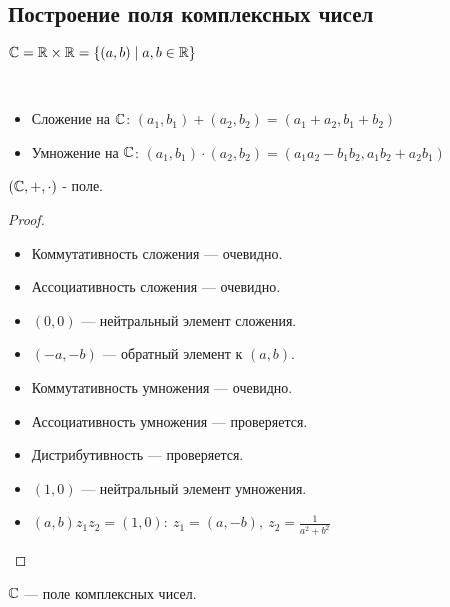 \begin{normalsize}

\section{Построение поля комплексных чисел}

\begin{defn}
    $\mathbb{C} = \mathbb{R} \times \mathbb{R} = \{(a, b) \mid a, b \in \mathbb{R}\}$\\
\end{defn}

\begin{defn} \
    \begin{itemize}
        \item Сложение на $\mathbb{C}$: $(a_1, b_1) + (a_2, b_2) = (a_1 + a_2, b_1 + b_2)$
        \item Умножение на $\mathbb{C}$: $(a_1, b_1) \cdot (a_2, b_2) = (a_1a_2 - b_1b_2, a_1b_2 + a_2b_1)$
    \end{itemize}
\end{defn}

\begin{theorem-non}
    $(\mathbb{C}, +, \cdot)$ - поле.
\end{theorem-non}

\begin{proof}
    \begin{itemize}
        \item Коммутативность сложения --- очевидно.
        \item Ассоциативность сложения --- очевидно.
        \item $(0, 0)$ --- нейтральный элемент сложения.
        \item $(-a, -b)$ --- обратный элемент к $(a, b)$.
        \item Коммутативность умножения --- очевидно.
        \item Ассоциативность умножения --- проверяется.
        \item Дистрибутивность --- проверяется.
        \item $(1, 0)$ --- нейтральный элемент умножения.
        \item $(a, b) z_1 z_2 = (1, 0):~z_1 = (a, -b),~z_2=\frac{1}{a^2+b^2}$
    \end{itemize}
\end{proof}

\begin{defn}
    $\mathbb{C}$ --- поле комплексных чисел.
\end{defn}


\end{normalsize}
